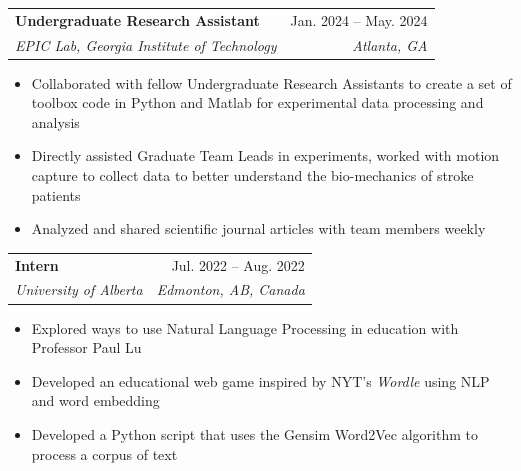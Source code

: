 \documentclass[letterpaper,11pt]{article}
\makeatletter
\newcommand{\resumeItem}[1]{
  \item\small{
    {#1 \vspace{-2pt}}
  }
}
\newcommand{\resumeSubheading}[4]{
  \vspace{-2pt}\item
    \begin{tabular*}{0.97\textwidth}[t]{l@{\extracolsep{\fill}}r}
      \textbf{\small#1} & \small #2 \\
      \textit{\small#3} & \textit{\small #4} \\
    \end{tabular*}\vspace{-5pt}
}
\newcommand{\resumeSubSubheading}[2]{
    \item
    \begin{tabular*}{0.97\textwidth}{l@{\extracolsep{\fill}}r}
      \textit{\small#1} & \textit{\small #2} \\
    \end{tabular*}\vspace{-5pt}
}
\newcommand{\resumeSubHeadingListEnd}{\end{itemize}}
\newcommand{\resumeItemListStart}{\begin{itemize}}
\newcommand{\resumeItemListEnd}{\end{itemize}\vspace{-5pt}}
\makeatother
\begin{document}

    \resumeSubheading
      {Undergraduate Research Assistant}{Jan. 2024 -- May. 2024}
      {EPIC Lab, Georgia Institute of Technology}{Atlanta, GA}
      \resumeItemListStart
        \resumeItem{Collaborated with fellow Undergraduate Research Assistants to create a set of toolbox code in Python and Matlab for experimental data processing and analysis}
        \resumeItem{Directly assisted Graduate Team Leads in experiments, worked with motion capture to collect data to better understand the bio-mechanics of stroke patients}
        \resumeItem{Analyzed and shared scientific journal articles with team members weekly}
    \resumeItemListEnd

    \resumeSubheading
      {Intern}{Jul. 2022 -- Aug. 2022}
      {University of Alberta}{Edmonton, AB, Canada}
      \resumeItemListStart
        \resumeItem{Explored ways to use Natural Language Processing in education with Professor Paul Lu}
        \resumeItem{Developed an educational web game inspired by NYT's \emph{Wordle} using NLP and word embedding}
        \resumeItem{Developed a Python script that uses the Gensim Word2Vec algorithm to process a corpus of text}
      \resumeItemListEnd
\end{document}
